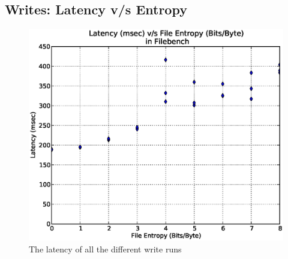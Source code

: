 \subsection{Writes: Latency v/s Entropy}
\begin{figure}[H]
\begin{center}
\includegraphics[scale=.55]{../results/set1/write_latency_all.eps}
\caption{The latency of all the different write runs}
\label{fig:wl}
\end{center}
\end{figure}


